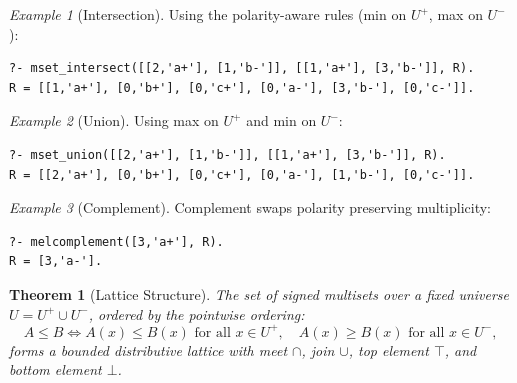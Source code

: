 \documentclass{article}
\theoremstyle{plain}
\newtheorem{theorem}{Theorem}
\theoremstyle{definition}
\theoremstyle{remark}
\newtheorem{example}{Example}
\begin{document}
\begin{example}[Intersection]
Using the polarity-aware rules (min on \(U^{+}\), max on \(U^{-}\)):
\begin{verbatim}
?- mset_intersect([[2,'a+'], [1,'b-']], [[1,'a+'], [3,'b-']], R).
R = [[1,'a+'], [0,'b+'], [0,'c+'], [0,'a-'], [3,'b-'], [0,'c-']].
\end{verbatim}
\end{example}

\begin{example}[Union]
Using max on \(U^{+}\) and min on \(U^{-}\):
\begin{verbatim}
?- mset_union([[2,'a+'], [1,'b-']], [[1,'a+'], [3,'b-']], R).
R = [[2,'a+'], [0,'b+'], [0,'c+'], [0,'a-'], [1,'b-'], [0,'c-']].
\end{verbatim}
\end{example}

\begin{example}[Complement]
Complement swaps polarity preserving multiplicity:
\begin{verbatim}
?- melcomplement([3,'a+'], R).
R = [3,'a-'].
\end{verbatim}
\end{example}

\begin{theorem}[Lattice Structure]
	The set of signed multisets over a fixed universe \(U = U^+ \cup U^-\), ordered by the pointwise ordering:
	\[
	A \leq B \iff A(x) \leq B(x) \text{ for all } x \in U^+, \quad A(x) \geq B(x) \text{ for all } x \in U^-,
	\]
	forms a bounded distributive lattice with meet \(\cap\), join \(\cup\), top element \(\top\), and bottom element \(\bot\).
\end{theorem}
\end{document}
